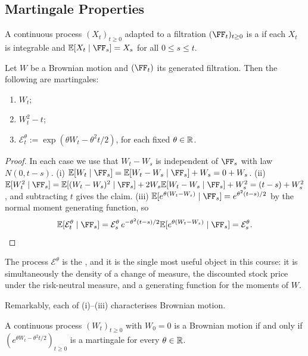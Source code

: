 \documentclass[a4paper]{scrartcl}
\begin{document}
\subsection{Martingale Properties}

\begin{definition}
	A continuous process $(X_t)_{t\geq0}$ adapted to a filtration $(\FF_t)_{t\geq0}$ is a  if each $X_t$ is integrable and $\EE[X_t\mid\FF_s] = X_s$ for all $0\leq s\leq t$.
\end{definition}

\begin{proposition}\label{prop:bm-martingales}
	Let $W$ be a Brownian motion and $(\FF_t)$ its generated filtration. Then the following are martingales:
	\begin{enumerate}[label=(\roman*)]
		\item $W_t$;
		\item $W_t^2 - t$;
		\item $\mathcal{E}^\theta_t := \exp(\theta W_t - \theta^2 t/2)$, for each fixed $\theta \in \mathbb{R}$.
	\end{enumerate}
\end{proposition}

\begin{proof}
	In each case we use that $W_t - W_s$ is independent of $\FF_s$ with law $N(0,t-s)$.
	(i) $\EE[W_t\mid\FF_s] = \EE[W_t-W_s\mid\FF_s] + W_s = 0 + W_s$.
	(ii) $\EE[W_t^2\mid\FF_s] = \EE[(W_t-W_s)^2\mid\FF_s] + 2W_s\EE[W_t-W_s\mid\FF_s] + W_s^2 = (t-s) + W_s^2$, and subtracting $t$ gives the claim.
	(iii) $\EE[e^{\theta(W_t-W_s)}\mid\FF_s] = e^{\theta^2(t-s)/2}$ by the normal moment generating function, so
	$$
	\EE[\mathcal{E}^\theta_t\mid\FF_s] = \mathcal{E}^\theta_s\, e^{-\theta^2(t-s)/2}\EE[e^{\theta(W_t-W_s)}\mid\FF_s] = \mathcal{E}^\theta_s. \qedhere
	$$
\end{proof}

The process $\mathcal{E}^\theta$ is the , and it is the single most useful object in this course: it is simultaneously the density of a change of measure, the discounted stock price under the risk-neutral measure, and a generating function for the moments of $W$.

Remarkably, each of (i)--(iii) characterises Brownian motion.

\begin{theorem}\label{thm:bm-char-exp}
	A continuous process $(W_t)_{t\geq0}$ with $W_0 = 0$ is a Brownian motion if and only if $(e^{\theta W_t - \theta^2t/2})_{t\geq0}$ is a martingale for every $\theta \in \mathbb{R}$.
\end{theorem}
\end{document}
